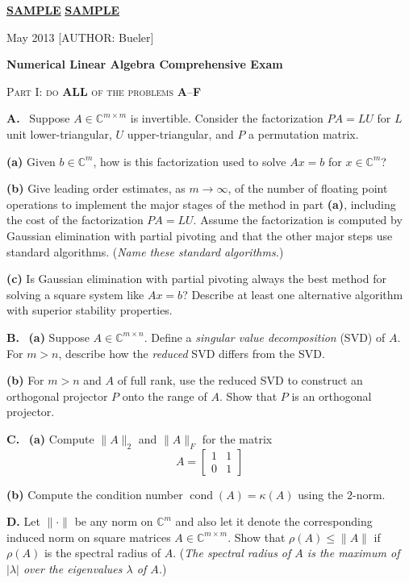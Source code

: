 \documentclass[11pt]{amsart}
\newcommand{\CC}{{\mathbb{C}}}
\newcommand{\prob}[1]{\bigskip\noindent\large\textbf{#1.} \, \normalsize}
\newcommand{\probpts}[2]{\bigskip\noindent\textbf{#1.} \quad}
\newcommand{\epartpts}[2]{\textbf{(#1)} \quad}
\newcommand{\partpts}[2]{\medskip\noindent \textbf{(#1)} \quad}
\begin{document}
\thispagestyle{empty}
\Large \noindent \underline{\textbf{SAMPLE}} \hfill\underline{\textbf{SAMPLE}}

\scriptsize {} May 2013  \hfill  \tiny [AUTHOR: Bueler]
\normalsize\bigskip

\centerline{\large\textbf{Numerical Linear Algebra Comprehensive Exam}}
\bigskip

\centerline{\textsc{Part I:  do \textbf{ALL} of the problems \textbf{A}--\textbf{F}}}
\smallskip

\thispagestyle{empty}

\prob{A}  Suppose $A\in \CC^{m\times m}$ is invertible.  Consider the factorization $PA=LU$ for $L$ unit lower-triangular, $U$ upper-triangular, and $P$ a permutation matrix.

\partpts{a}{5}  Given $b\in \CC^m$, how is this factorization used to solve $Ax=b$ for $x\in\CC^m$?

\partpts{b}{5}  Give leading order estimates, as $m\to \infty$, of the number of floating point operations to implement the major stages of the method in part \textbf{(a)}, including the cost of the factorization $PA=LU$.  Assume the factorization is computed by Gaussian elimination with partial pivoting and that the other major steps use standard algorithms.  (\emph{Name these standard algorithms.})

\partpts{c}{5}  Is Gaussian elimination with partial pivoting always the best method for solving a square system like $Ax=b$?  Describe at least one alternative algorithm with superior stability properties.

\prob{B}  \epartpts{a}{5}  Suppose $A\in\CC^{m\times n}$.  Define a \emph{singular value decomposition} (SVD) of $A$.  For $m>n$, describe how the \emph{reduced} SVD differs from the SVD.

\partpts{b}{5}  For $m>n$ and $A$ of full rank, use the reduced SVD to construct an orthogonal projector $P$ onto the range of $A$.  Show that $P$ is an orthogonal projector.

\prob{C}  \epartpts{a}{5}  Compute $\|A\|_2$ and $\|A\|_F$ for the matrix
    $$A = \begin{bmatrix} 1 & 1 \\ 0 & 1 \end{bmatrix}$$

\epartpts{b}{5}  Compute the condition number $\operatorname{cond}(A) = \kappa(A)$ using the $2$-norm.

\probpts{D}{5}  Let $\|\cdot\|$ be any norm on $\CC^m$ and also let it denote the corresponding induced norm on square matrices $A\in\CC^{m\times m}$.  Show that $\rho(A) \le \|A\|$ if $\rho(A)$ is the spectral radius of $A$.  (\emph{The \emph{spectral radius} of $A$ is the maximum of $|\lambda|$ over the eigenvalues $\lambda$ of $A$.})
\end{document}
